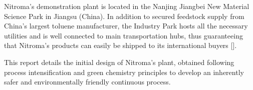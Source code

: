 Nitroma's demonstration plant is located in the Nanjing Jiangbei New Material Science Park in Jiangsu (China). In addition to secured feedstock supply from China’s largest toluene manufacturer, the Industry Park hosts all the necessary utilities and is well connected to main transportation hubs, thus guaranteeing that Nitroma's products can easily be shipped to its international buyers []. 


This report details the initial design of Nitroma's plant, obtained following process intensification and green chemistry principles to develop an inherently safer and environmentally friendly continuous process.



